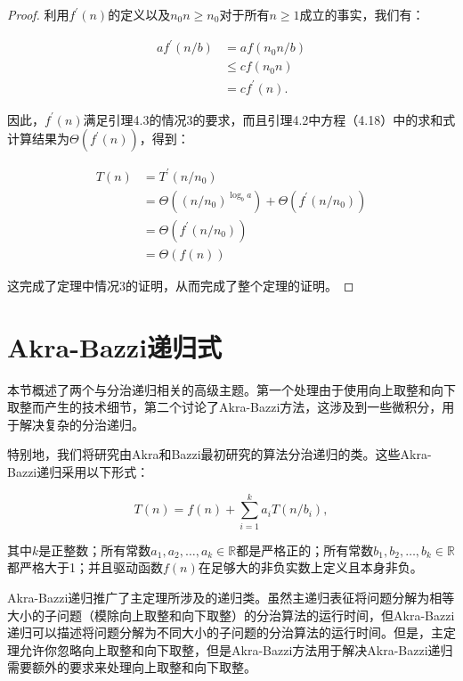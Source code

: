 \documentclass[lang=cn,newtx,10pt,scheme=chinese]{elegantbook}
\begin{document}
\begin{proof}
利用$f^{\prime}(n)$的定义以及$n_0 n \geq n_0$对于所有$n \geq 1$成立的事实，我们有：

$$
\begin{aligned}
a f^{\prime}(n / b) & =a f\left(n_0 n / b\right) \\
& \leq c f\left(n_0 n\right) \\
& =c f^{\prime}(n) .
\end{aligned}
$$

因此，$f^{\prime}(n)$满足引理4.3的情况3的要求，而且引理4.2中方程（4.18）中的求和式计算结果为$\Theta\left(f^{\prime}(n)\right)$，得到：

$$
\begin{aligned}
T(n) & =T^{\prime}\left(n / n_0\right) \\
& =\Theta\left(\left(n / n_0\right)^{\log _b a}\right)+\Theta\left(f^{\prime}\left(n / n_0\right)\right) \\
& =\Theta\left(f^{\prime}\left(n / n_0\right)\right) \\
& =\Theta(f(n))
\end{aligned}
$$

这完成了定理中情况3的证明，从而完成了整个定理的证明。
\end{proof}

\section{Akra-Bazzi递归式}\label{section-4.7}

本节概述了两个与分治递归相关的高级主题。第一个处理由于使用向上取整和向下取整而产生的技术细节，第二个讨论了Akra-Bazzi方法，这涉及到一些微积分，用于解决复杂的分治递归。

特别地，我们将研究由Akra和Bazzi最初研究的算法分治递归的类。这些Akra-Bazzi递归采用以下形式：

\begin{equation}
T(n)=f(n)+\sum_{i=1}^k a_i T\left(n / b_i\right),
\end{equation}

其中$k$是正整数；所有常数$a_1, a_2, \ldots, a_k \in \mathbb{R}$都是严格正的；所有常数$b_1, b_2, \ldots, b_k \in \mathbb{R}$都严格大于1；并且驱动函数$f(n)$在足够大的非负实数上定义且本身非负。

Akra-Bazzi递归推广了主定理所涉及的递归类。虽然主递归表征将问题分解为相等大小的子问题（模除向上取整和向下取整）的分治算法的运行时间，但Akra-Bazzi递归可以描述将问题分解为不同大小的子问题的分治算法的运行时间。但是，主定理允许你忽略向上取整和向下取整，但是Akra-Bazzi方法用于解决Akra-Bazzi递归需要额外的要求来处理向上取整和向下取整。
\end{document}
